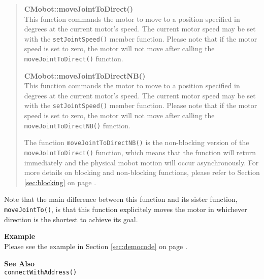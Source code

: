 \begin{quote}
{\bf CMobot::moveJointToDirect()}\\
This function commands the motor to move to a position specified in degrees at
the current motor's speed. The current motor speed may be set with the
\texttt{setJointSpeed()} member function. Please note that if the motor speed
is set to zero, the motor will not move after calling the
\texttt{moveJointToDirect()} function. 

{\bf CMobot::moveJointToDirectNB()}\\
This function commands the motor to move to a position specified in degrees at
the current motor's speed. The current motor speed may be set with the
\texttt{setJointSpeed()} member function. Please note that if the motor speed
is set to zero, the motor will not move after calling the
\texttt{moveJointToDirectNB()} function. 

The function \texttt{moveJointToDirectNB()} is the non-blocking version of
the \texttt{moveJointToDirect()} function, which means that the function will return
immediately and the physical mobot motion will occur asynchronously. For
more details on blocking and non-blocking functions, please refer to 
Section \ref{sec:blocking} on page \pageref{sec:blocking}.\\
\end{quote}

Note that the main difference between this function and its sister function,
\texttt{moveJointTo()}, is that this function explicitely moves the motor in
whichever direction is the shortest to achieve its goal.

\noindent
{\bf Example}\\
Please see the example in Section \ref{sec:democode} on page \pageref{sec:democode}.\\
\noindent

\noindent
{\bf See Also}\\
\texttt{connectWithAddress()}

